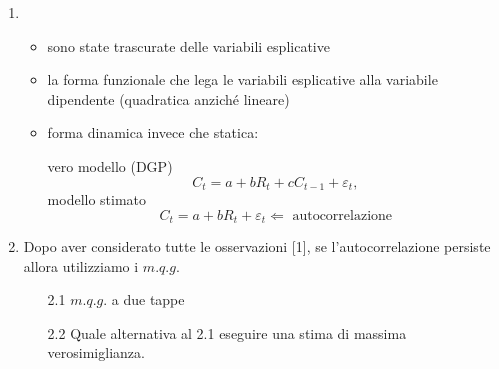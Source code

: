 \documentclass[a4paper]{report}
\newcounter{ese}
\theoremstyle{remark}
\begin{document}
\begin{enumerate}
\item 
\begin{itemize}
\item sono state trascurate delle variabili esplicative

\item la forma funzionale che lega le variabili esplicative alla variabile
dipendente (quadratica anzich\'{e} lineare)

\item forma dinamica invece che statica:

vero modello (DGP)\ 
\begin{equation*}
C_{t}=a+bR_{t}+cC_{t-1}+\varepsilon _{t},
\end{equation*}%
modello stimato%
\begin{equation*}
C_{t}=a+bR_{t}+\varepsilon _{t}\Leftarrow \text{ autocorrelazione}
\end{equation*}
\end{itemize}

\item Dopo aver considerato tutte le osservazioni [1], se l'autocorrelazione
persiste allora utilizziamo i $m.q.g.$

\begin{enumerate}
\item[2.1] $m.q.g.$ a due tappe


\item[2.2] Quale alternativa al 2.1 eseguire una stima di massima
verosimiglianza.
\end{enumerate}
\end{enumerate}
\end{document}
